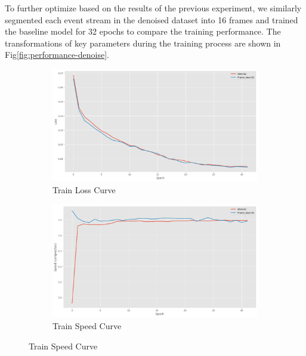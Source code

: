 \documentclass[conference]{IEEEtran}
\begin{document}
To further optimize based on the results of the previous experiment, we similarly segmented each event stream in the denoised dataset into 16 frames 
and trained the baseline model for 32 epochs to compare the training performance. 
The transformations of key parameters during the training process are shown in Fig\ref{fig:performance-denoise}.
\begin{figure}[htbp]
    \centering
    \begin{subfigure}[b]{0.24\textwidth}
        \centering
        \includegraphics[width=\textwidth]{figure/denoise_train_loss.png}
        \caption{Train Loss Curve}
        \label{fig:sub1-d}
    \end{subfigure}
    \begin{subfigure}[b]{0.24\textwidth}
        \centering
        \includegraphics[width=\textwidth]{figure/denoise_train_speed.png}
        \caption{Train Speed Curve}
        \label{fig:sub2-d}
    \end{subfigure}

    \vspace{0.01em} %


\end{figure}
\end{document}
